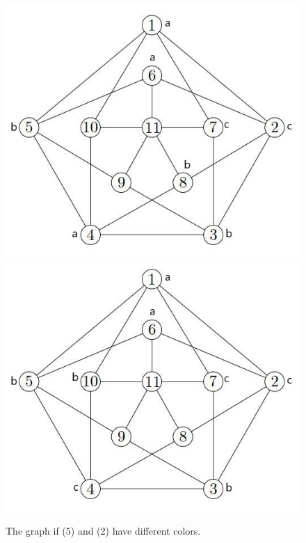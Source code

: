 \documentclass{article}
\begin{document}
\begin{figure}[h]
    \includegraphics[scale = 0.53]{2.1.a}
    \includegraphics[scale = 0.53]{2.1.b}
    \caption{The graph if (5) and (2) have different colors.}
\end{figure}
\end{document}
